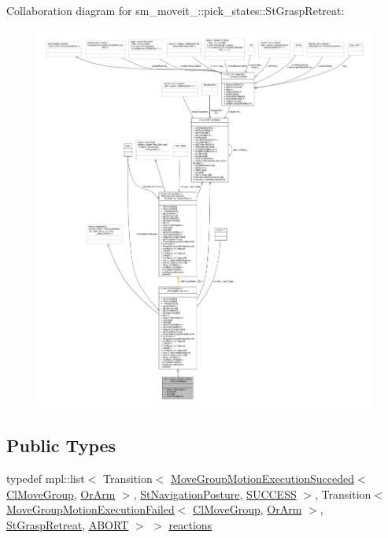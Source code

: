 Collaboration diagram for sm\+\_\+moveit\+\_\+:\+:pick\+\_\+states\+:\+:St\+Grasp\+Retreat\+:
\nopagebreak
\begin{figure}[H]
\begin{center}
\leavevmode
\includegraphics[width=350pt]{structsm__moveit__4_1_1pick__states_1_1StGraspRetreat__coll__graph}
\end{center}
\end{figure}
\subsection*{Public Types}
\begin{DoxyCompactItemize}
\item 
typedef mpl\+::list$<$ Transition$<$ \hyperlink{structmoveit__z__client_1_1MoveGroupMotionExecutionSucceded}{Move\+Group\+Motion\+Execution\+Succeded}$<$ \hyperlink{classmoveit__z__client_1_1ClMoveGroup}{Cl\+Move\+Group}, \hyperlink{classsm__moveit__4_1_1OrArm}{Or\+Arm} $>$, \hyperlink{structsm__moveit__4_1_1pick__states_1_1StNavigationPosture}{St\+Navigation\+Posture}, \hyperlink{classSUCCESS}{S\+U\+C\+C\+E\+SS} $>$, Transition$<$ \hyperlink{structmoveit__z__client_1_1MoveGroupMotionExecutionFailed}{Move\+Group\+Motion\+Execution\+Failed}$<$ \hyperlink{classmoveit__z__client_1_1ClMoveGroup}{Cl\+Move\+Group}, \hyperlink{classsm__moveit__4_1_1OrArm}{Or\+Arm} $>$, \hyperlink{structsm__moveit__4_1_1pick__states_1_1StGraspRetreat}{St\+Grasp\+Retreat}, \hyperlink{classABORT}{A\+B\+O\+RT} $>$ $>$ \hyperlink{structsm__moveit__4_1_1pick__states_1_1StGraspRetreat_a4f5f191fa9aeaa24fd24043f983f43a8}{reactions}
\end{DoxyCompactItemize}
